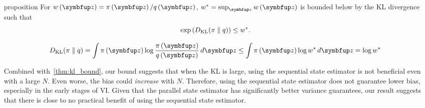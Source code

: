 

\begin{theoremEnd}{proposition}\label{thm:kl_bound}
  For \(w\left(\vz\right) = \pi\left(\vz\right) / q\left(\vz\right)\), \(w^* = \sup_{\vz} w\left(\vz\right) \) is bounded below by the KL divergence such that
  \[
  \exp\left(D_{\mathrm{KL}}(\pi\parallel q)\right) \leq w^*.
  \]
\end{theoremEnd}
\vspace{-0.1in}
\begin{proofEnd}
  \begin{align*}
    \DKL{\pi}{ q}
    = \int \pi\left(\vz\right) \log \frac{\pi\left(\vz\right)}{q\left(\vz\right)}\,d\vz 
    \leq \int \pi\left(\vz\right) \log w^* \, d\vz 
    = \log w^*
  \end{align*}
\end{proofEnd}

Combined with~\cref{thm:kl_bound}, our bound suggests that when the KL is large, using the sequential state estimator is not beneficial even with a large \(N\).
Even worse, the bias could \textit{increase} with \(N\).
Therefore, using the sequential state estimator does not guarantee lower bias, especially in the early stages of VI.
Given that the parallel state estimator has significantly better variance guarantees, our result suggests that there is close to no practical benefit of using the sequential state estimator.



%

